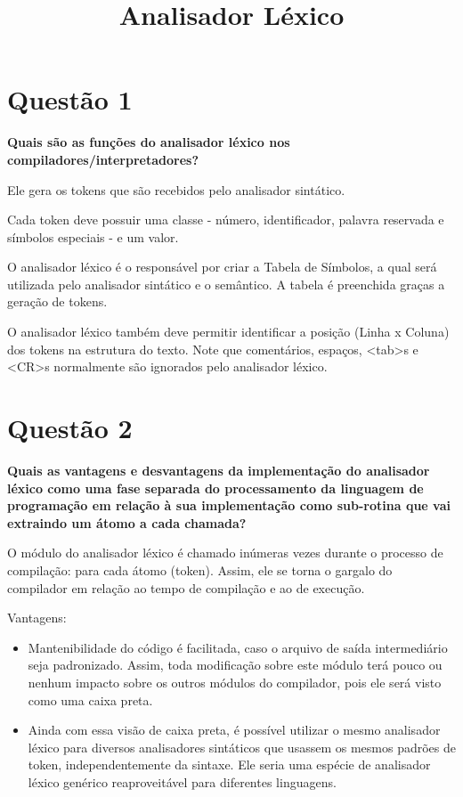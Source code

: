 \documentclass[
	article,			%
	11pt,				%
	oneside,			%
	a4paper,			%
	english,			%
	brazil,				%
	]{abntex2}
\title{Analisador Léxico}
\begin{document}
\frenchspacing %

\imprimirfolhaderosto

\clearpage

\textual

\section{Questão 1}

\textbf{Quais são as funções do analisador léxico nos compiladores/interpretadores?}

Ele gera os tokens que são recebidos pelo analisador sintático.

Cada token deve possuir uma classe  - número, identificador, palavra reservada e símbolos especiais - e um valor.

O analisador léxico é o responsável por criar a Tabela de Símbolos, a qual será utilizada pelo analisador sintático e o semântico. A tabela é preenchida graças a geração de tokens.

O analisador léxico também deve permitir identificar a posição (Linha x Coluna) dos tokens na estrutura do texto. Note que comentários, espaços, <tab>s e <CR>s normalmente são ignorados pelo analisador léxico.
 
\section{Questão 2}           
\textbf{Quais as vantagens e desvantagens da implementação do analisador léxico como uma fase separada do processamento da linguagem de programação em relação à sua implementação como sub-rotina que vai extraindo um átomo a cada chamada?}

O módulo do analisador léxico é chamado inúmeras vezes durante o processo de compilação: para cada átomo (token). Assim, ele se torna o gargalo do compilador em relação ao tempo de compilação e ao de execução.

Vantagens:
\begin{itemize}
	\item Mantenibilidade do código é facilitada, caso o arquivo de saída intermediário seja padronizado. Assim, toda modificação sobre este módulo terá pouco ou nenhum impacto sobre os outros módulos do compilador, pois ele será visto como uma caixa preta. 
	\item Ainda com essa visão de caixa preta, é possível utilizar o mesmo analisador léxico para diversos analisadores sintáticos que usassem os mesmos padrões de token, independentemente da sintaxe. Ele seria uma espécie de analisador léxico genérico reaproveitável para diferentes linguagens.
\end{itemize}
\end{document}
